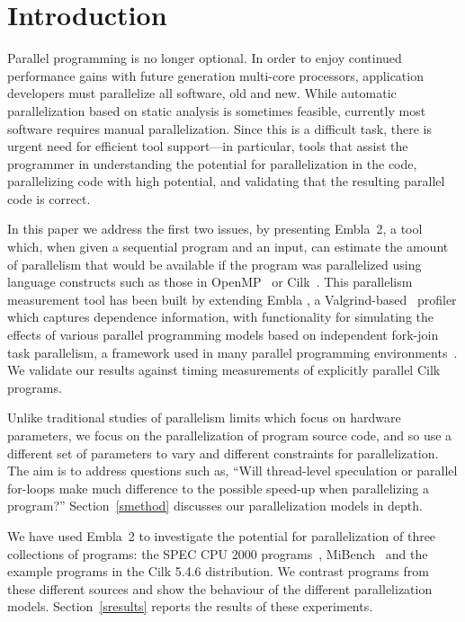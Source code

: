 \section{Introduction}

Parallel programming is no longer optional.  In order to enjoy continued
performance gains with future generation multi-core processors,
application developers must parallelize all software, old and
new.
While automatic parallelization based on static analysis 
is sometimes feasible, currently most software requires manual
parallelization.
Since this is a difficult task, there is urgent need for efficient tool support---in
particular, tools that assist the programmer in understanding the potential 
for parallelization in the code, parallelizing code with high potential, 
and validating that the resulting parallel code is correct.

In this paper we address the first two issues, by presenting Embla~2, a tool
which, when given a sequential program and an input, can estimate the 
amount of parallelism that would be available if the program was parallelized
using language constructs such as those in OpenMP~\cite{dagum98openmp}
or Cilk~\cite{blumofe96cilk}.
This parallelism measurement tool has been built by extending
Embla \cite{embla:08}, a Valgrind-based~\cite{valgrind:07} profiler which captures dependence information,
with functionality for simulating the effects of various parallel 
programming models based on independent fork-join task parallelism,
a framework used in many parallel programming
environments~\cite{blumofe96cilk,lea00java,reinders07intel,leijen07parallel}.
We validate our results against timing 
measurements of explicitly parallel Cilk programs.

Unlike traditional studies of parallelism limits \cite{wall91limits,warg01limits}
which focus on hardware parameters, we focus on the 
parallelization of program source code, and so use a
different set of parameters to vary and different constraints for
parallelization. The aim is to address questions such as,
``Will thread-level speculation or parallel for-loops make much
difference to the possible speed-up when parallelizing
a program?'' Section~\ref{smethod} 
discusses our parallelization models in depth.

We have used Embla~2 to investigate the potential for 
parallelization of three collections of programs: the SPEC CPU 2000 
programs~\cite{henning00spec}, MiBench~\cite{guthaus01mibench} and the example programs in
the Cilk 5.4.6 distribution.
We contrast programs from these different sources and show the behaviour of 
the different parallelization models.
Section~\ref{sresults} reports the results of these experiments.

